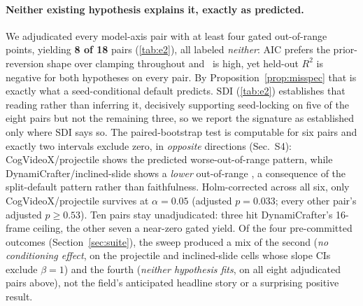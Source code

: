 \documentclass[10pt,twocolumn,letterpaper]{article}
\begin{document}
\paragraph{Neither existing hypothesis explains it, exactly as predicted.}
We adjudicated every model-axis pair with at least four gated out-of-range
points, yielding \textbf{8 of 18} pairs (\autoref{tab:e2}), all labeled
\emph{neither}: AIC prefers the prior-reversion shape over clamping
throughout and \PRI\ is high, yet held-out $R^2$ is negative for both
hypotheses on every pair. By Proposition~\ref{prop:misspec} that is
exactly what a seed-conditional default predicts. $\mathrm{SDI}$
(\autoref{tab:e2}) establishes that reading rather than inferring it,
decisively supporting seed-locking on five of the eight pairs but not the
remaining three, so we report the signature as established only where
$\mathrm{SDI}$ says so. The paired-bootstrap test is computable for six
pairs and exactly two intervals exclude zero, in \emph{opposite}
directions (Sec.~S4): CogVideoX/projectile shows the predicted
worse-out-of-range pattern, while DynamiCrafter/inclined-slide shows a
\emph{lower} out-of-range \PRE, a consequence of the split-default pattern
rather than faithfulness. Holm-corrected across all six, only
CogVideoX/projectile survives at $\alpha=0.05$ (adjusted $p=0.033$; every
other pair's adjusted $p\ge0.53$). Ten pairs stay unadjudicated: three hit
DynamiCrafter's 16-frame ceiling, the other seven a near-zero gated yield.
Of the four pre-committed outcomes (Section~\ref{sec:suite}), the sweep
produced a mix of the second (\emph{no conditioning effect}, on the
projectile and inclined-slide cells whose slope CIs exclude $\beta=1$) and
the fourth (\emph{neither hypothesis fits}, on all eight adjudicated
pairs above), not the field's anticipated headline story or a surprising
positive result.
\end{document}
